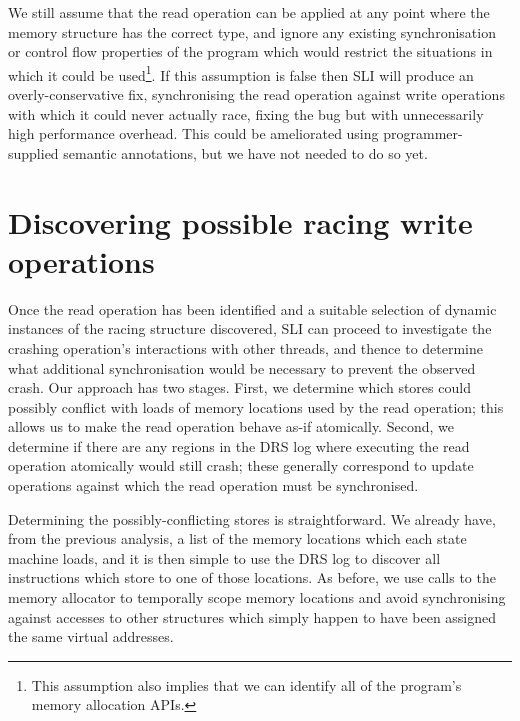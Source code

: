 \documentclass[10pt,letter,twocolumn]{sigplanconf}
\begin{document}
We still assume that the read operation can be applied at any point
where the memory structure has the correct type, and ignore any
existing synchronisation or control flow properties of the program
which would restrict the situations in which it could be
used\footnote{This assumption also implies that we can identify all of
  the program's memory allocation APIs.}.  If this assumption is false
then SLI will produce an overly-conservative fix, synchronising the
read operation against write operations with which it could never
actually race, fixing the bug but with unnecessarily high performance
overhead.  This could be ameliorated using programmer-supplied
semantic annotations, but we have not needed to do so yet.

\section{Discovering possible racing write operations}
\label{sect:multi_threading}

Once the read operation has been identified and a suitable selection
of dynamic instances of the racing structure discovered, SLI can
proceed to investigate the crashing operation's interactions with
other threads, and thence to determine what additional synchronisation
would be necessary to prevent the observed crash.  Our approach has
two stages.  First, we determine which stores could possibly conflict
with loads of memory locations used by the read operation; this allows
us to make the read operation behave as-if atomically.  Second, we
determine if there are any regions in the DRS log where executing the
read operation atomically would still crash; these generally
correspond to update operations against which the read operation must
be synchronised.

Determining the possibly-conflicting stores is straightforward.  We
already have, from the previous analysis, a list of the memory
locations which each state machine loads, and it is then simple to use
the DRS log to discover all instructions which store to one of those
locations.  As before, we use calls to the memory allocator to
temporally scope memory locations and avoid synchronising against
accesses to other structures which simply happen to have been assigned
the same virtual addresses.
\end{document}
